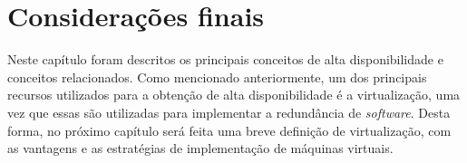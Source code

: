 \section{Considerações finais}

Neste capítulo foram descritos os principais conceitos de alta disponibilidade e conceitos relacionados. Como mencionado anteriormente, 
um dos principais recursos utilizados para a obtenção de alta disponibilidade é a virtualização, uma vez que essas são utilizadas para 
implementar a redundância de \textit{software}. Desta forma, no próximo capítulo será feita uma breve definição de virtualização, 
com as vantagens e as estratégias de implementação de máquinas virtuais.

